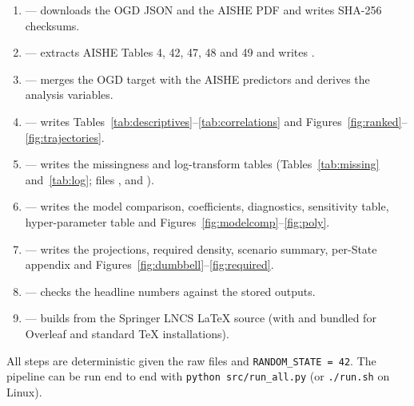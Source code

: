 \begin{enumerate}
  \item {} --- downloads the OGD JSON and the AISHE PDF and writes SHA-256 checksums.
  \item {} --- extracts AISHE Tables 4, 42, 47, 48 and 49 and writes .
  \item {} --- merges the OGD target with the AISHE predictors and derives the analysis variables.
  \item {} --- writes Tables~\ref{tab:descriptives}--\ref{tab:correlations} and Figures~\ref{fig:ranked}--\ref{fig:trajectories}.
  \item {} --- writes the missingness and log-transform tables (Tables~\ref{tab:missing} and~\ref{tab:log}; files ,  and ).
  \item {} --- writes the model comparison, coefficients, diagnostics, sensitivity table, hyper-parameter table and Figures~\ref{fig:modelcomp}--\ref{fig:poly}.
  \item {} --- writes the projections, required density, scenario summary, per-State appendix and Figures~\ref{fig:dumbbell}--\ref{fig:required}.
  \item {} --- checks the headline numbers against the stored outputs.
  \item {} --- builds  from the Springer LNCS LaTeX source (with  and  bundled for Overleaf and standard TeX installations).
\end{enumerate}

All steps are deterministic given the raw files and \texttt{RANDOM\_STATE = 42}. The pipeline can be run end to end with \texttt{python src/run\_all.py} (or \texttt{./run.sh} on Linux).
